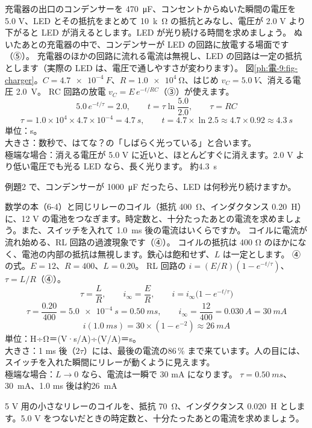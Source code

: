 \label{ph:電-9:ex2}
\begin{phreidai}
充電器の出口のコンデンサーを \qty{470}{\micro F}、コンセントからぬいた瞬間の電圧を 5.0 V、LED とその抵抗をまとめて \qty{10}{k\ohm} の抵抗とみなし、電圧が 2.0 V より下がると LED が消えるとします。LED が光り続ける時間を求めましょう。
\phbamen
ぬいたあとの充電器の中で、コンデンサーが LED の回路に放電する場面です（⑤）。
\phmushi
充電器のほかの回路に流れる電流は無視し、LED の回路は一定の抵抗とします（実際の LED は、電圧で通しやすさが変わります）。
\phzu
図\ref{ph:電-9:fig-charger}。$C=\qty{4.7e-4}{F}$、$R=\qty{1.0e4}{\ohm}$、はじめ $v_C=\qty{5.0}{V}$、消える電圧 \qty{2.0}{V}。
\phriyu
RC 回路の放電 $v_C=E\,e^{-t/RC}$（③）が使えます。
\phtateru
\[ 5.0\,e^{-t/\tau}=2.0,\qquad t=\tau\ln\frac{5.0}{2.0},\qquad\tau=RC \]
\phtoku
\[ \tau=1.0\times10^4\times4.7\times10^{-4}=\qty{4.7}{s},\qquad t=4.7\times\ln2.5\approx4.7\times0.92\approx\qty{4.3}{s} \]
\phtashikame
単位：s。\\
大きさ：数秒で、はてな？の「しばらく光っている」と合います。\\
極端な場合：消える電圧が 5.0 V に近いと、ほとんどすぐに消えます。2.0 V より低い電圧でも光る LED なら、長く光ります。
\kotae 約\qty{4.3}{s}
\end{phreidai}
\begin{jibun}
例題2 で、コンデンサーが \qty{1000}{\micro F} だったら、LED は何秒光り続けますか。
\end{jibun}

\label{ph:電-9:ex3}
\begin{phreidai}[リレーのコイルの電流]
数学の本（6-4）と同じリレーのコイル（抵抗 \qty{400}{\ohm}、インダクタンス \qty{0.20}{H}）に、12 V の電池をつなぎます。時定数と、十分たったあとの電流を求めましょう。また、スイッチを入れて \qty{1.0}{ms} 後の電流はいくらですか。
\phbamen
コイルに電流が流れ始める、RL 回路の過渡現象です（④）。
\phmushi
コイルの抵抗は 400 Ω のほかになく、電池の内部の抵抗は無視します。鉄心は飽和せず、$L$ は一定とします。
\phzu
④の式。$E=12$、$R=400$、$L=0.20$。
\phriyu
RL 回路の $i=(E/R)(1-e^{-t/\tau})$、$\tau=L/R$（④）。
\phtateru
\[ \tau=\frac{L}{R},\qquad i_\infty=\frac{E}{R},\qquad i=i_\infty\bigl(1-e^{-t/\tau}\bigr) \]
\phtoku
\[ \tau=\frac{0.20}{400}=\qty{5.0e-4}{s}=\qty{0.50}{ms},\qquad i_\infty=\frac{12}{400}=\qty{0.030}{A}=\qty{30}{mA} \]
\[ i(\qty{1.0}{ms})=30\times(1-e^{-2})\approx\qty{26}{mA} \]
\phtashikame
単位：H÷Ω＝(V·s/A)÷(V/A)＝s。\\
大きさ：1 ms 後（$2\tau$）には、最後の電流の86\,\% まで来ています。人の目には、スイッチを入れた瞬間にリレーが動くように見えます。\\
極端な場合：$L\to0$ なら、電流は一瞬で 30 mA になります。
\kotae $\tau=\qty{0.50}{ms}$、\qty{30}{mA}、1.0 ms 後は約\qty{26}{mA}
\end{phreidai}
\begin{jibun}
5 V 用の小さなリレーのコイルを、抵抗 \qty{70}{\ohm}、インダクタンス \qty{0.020}{H} とします。5.0 V をつないだときの時定数と、十分たったあとの電流を求めましょう。
\end{jibun}

